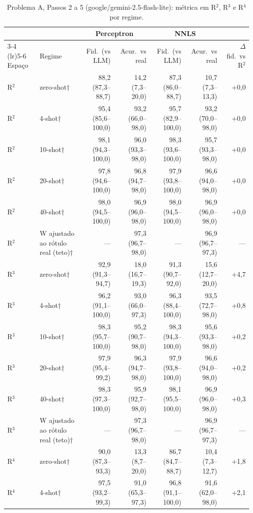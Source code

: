 \begin{table}[htbp]
\centering
\small
\caption{Problema A, Passos 2 a 5 (google/gemini-2.5-flash-lite): métrica em R$^2$, R$^3$ e R$^4$ por regime.}
\label{tab:bloco1_A_passo4_R2_R3_R4_flashlite}
\begin{tabular}{llrrrrr}
\toprule
 &  & \multicolumn{2}{c}{Perceptron} & \multicolumn{2}{c}{NNLS} &  \\ \cmidrule(lr){3-4} \cmidrule(lr){5-6}
Espaço & Regime & Fid.\ (vs LLM) & Acur.\ vs real & Fid.\ (vs LLM) & Acur.\ vs real & $\Delta$ fid.\ vs R$^2$ \\
\midrule
R$^2$ & zero-shot† & 88,2 (87,3–88,7) & 14,2 (7,3–20,0) & 87,3 (86,0–88,7) & 10,7 (7,3–13,3) & +0,0 \\
R$^2$ & 4-shot† & 95,4 (85,6–100,0) & 93,2 (66,0–98,0) & 95,7 (82,9–100,0) & 93,2 (70,0–98,0) & +0,0 \\
R$^2$ & 10-shot† & 98,1 (94,3–100,0) & 96,0 (93,3–98,0) & 98,3 (93,6–100,0) & 95,7 (93,3–98,0) & +0,0 \\
R$^2$ & 20-shot† & 97,8 (94,6–100,0) & 96,8 (94,7–98,0) & 97,9 (93,8–100,0) & 96,6 (94,0–98,0) & +0,0 \\
R$^2$ & 40-shot† & 98,0 (94,5–100,0) & 96,9 (96,0–98,0) & 98,0 (94,5–100,0) & 96,9 (96,0–98,0) & +0,0 \\
R$^2$ & W ajustado ao rótulo real (teto)† & — & 97,3 (96,7–98,0) & — & 96,9 (96,7–97,3) & — \\
\midrule
R$^3$ & zero-shot† & 92,9 (91,3–94,7) & 18,0 (16,7–19,3) & 91,3 (90,7–92,0) & 15,6 (12,7–20,0) & +4,7 \\
R$^3$ & 4-shot† & 96,2 (91,1–100,0) & 93,0 (66,0–97,3) & 96,3 (88,4–100,0) & 93,5 (72,7–98,0) & +0,8 \\
R$^3$ & 10-shot† & 98,3 (95,7–100,0) & 95,2 (90,7–98,0) & 98,3 (94,3–100,0) & 95,6 (93,3–98,0) & +0,2 \\
R$^3$ & 20-shot† & 97,9 (95,4–99,2) & 96,3 (94,7–98,0) & 97,9 (93,8–100,0) & 96,6 (94,0–98,0) & +0,2 \\
R$^3$ & 40-shot† & 98,3 (97,3–100,0) & 95,9 (92,7–98,0) & 98,1 (95,5–100,0) & 96,9 (96,0–98,0) & +0,3 \\
R$^3$ & W ajustado ao rótulo real (teto)† & — & 97,3 (96,7–98,0) & — & 96,9 (96,7–97,3) & — \\
\midrule
R$^4$ & zero-shot† & 90,0 (87,3–93,3) & 13,3 (8,7–20,0) & 86,7 (84,7–88,7) & 10,4 (7,3–12,7) & +1,8 \\
R$^4$ & 4-shot† & 97,5 (93,2–99,3) & 91,0 (65,3–97,3) & 96,8 (91,1–100,0) & 91,6 (62,0–98,0) & +2,1 \\

\end{tabular}
\end{table}
